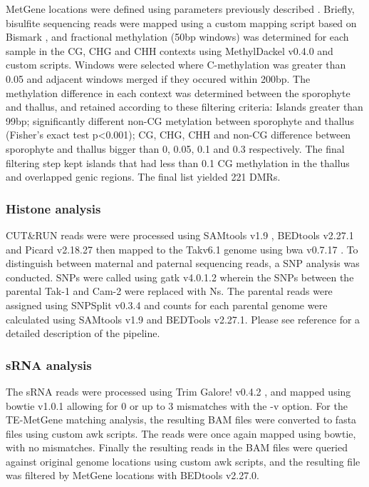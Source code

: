 MetGene locations were defined using parameters previously described \citep{jimmythesis}. Briefly, bisulfite sequencing reads were mapped using a custom mapping script based on Bismark \citep{RN229}, and fractional methylation (50bp windows) was determined for each sample in the  CG, CHG and CHH contexts using MethylDackel v0.4.0 and custom scripts. Windows were selected where C-methylation was greater than 0.05 and adjacent windows merged if they occured within 200bp. The methylation difference in each context was determined between the sporophyte and thallus, and retained according to these filtering criteria: Islands greater than 99bp; significantly different non-CG metylation between sporophyte and thallus (Fisher's exact test p<0.001); CG, CHG, CHH and non-CG difference between sporophyte and thallus bigger than 0, 0.05, 0.1 and 0.3 respectively. The final filtering step kept islands that had less than 0.1 CG methylation in the thallus and overlapped genic regions. The final list yielded 221 DMRs.

\subsubsection{Histone analysis}

CUT\&RUN reads were were processed using SAMtools v1.9 \citep{RN174}, BEDtools v2.27.1 \citep{RN90} and Picard v2.18.27 \citep{RN173} then mapped to the Takv6.1 genome \citep{RN179} using bwa v0.7.17 \citep{RN182}. To distinguish between maternal and paternal sequencing reads, a SNP analysis was conducted. SNPs were called using gatk v4.0.1.2 \citep{RN177} wherein the SNPs between the parental Tak-1 and Cam-2 were replaced with Ns. The parental reads were assigned using SNPSplit v0.3.4 \citep{RN178} and counts for each parental genome were calculated using SAMtools v1.9 and BEDTools v2.27.1. Please see reference \cite{RN160}  for a detailed description of the pipeline. 

\subsubsection{sRNA analysis}

The sRNA reads were processed using Trim Galore! v0.4.2 \citep{trim_galore}, and mapped using bowtie v1.0.1 \citep{RN89} allowing for 0 or up to 3 mismatches with the -v option. For the TE-MetGene matching analysis, the resulting BAM files were converted to fasta files using custom awk scripts. The reads were once again mapped using bowtie, with no mismatches. Finally the resulting reads in the BAM files were queried against original genome locations using custom awk scripts, and the resulting file was filtered by MetGene locations with BEDtools v2.27.0.

